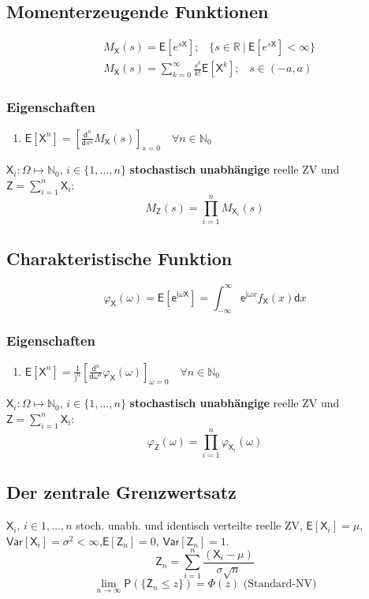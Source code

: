 \documentclass[a4paper,twocolumn,10pt]{article}
\newenvironment{iii}{\begin{enumerate}[label={\roman{*})}]}{\end{enumerate}}
\newcommand{\var}{\mathsf{Var}}
\newcommand{\erw}{\mathsf{E}}
\newcommand{\e}{\mathsf{e}}
\newcommand{\X}{\mathsf{X}}
\newcommand{\im}{\mathrm{j}}
\begin{document}
\subsection{Momenterzeugende Funktionen}
\[\begin{split}&M_{\mathsf{X}}(s)= \erw[e^{s\mathsf{X}}];\;\;\;\{ s \in \mathbb{R} \ | \ \erw[e^{s \mathsf{X}}] < \infty \}\\ &M_{\mathsf{X}}(s)= \sum \limits_{k=0}^{\infty} \frac{s^{k}}{k!} \erw[\mathsf{X}^{k}];\;\;\; s \in (-a,a)\end{split}\]

\subsubsection{Eigenschaften}
\begin{iii}
\item $\erw [\mathsf{X}^{n}] = \left[ \frac{\mathsf{d}^{n}}{\mathsf{d}s^{n}}  M_{\mathsf{X}}(s) \right]_{s=0} \quad \forall n \in \mathbb{N}_{0}$
\end{iii}
$\mathsf{X}_{i}: \Omega \mapsto \mathbb{N}_{0}, \, i \in \{1, \dots, n\}$ \textbf{stochastisch unabhängige} reelle ZV und $\mathsf{Z} = \sum_{i=1}^{n} \mathsf{X}_{i}$:
\[ M_{\mathsf{Z}}(s) = \prod_{i=1}^{n} M_{\mathsf{X}_{i}}(s) \]

\subsection{Charakteristische Funktion}
\[ \varphi_{\mathsf{X}}(\omega) = \erw[\e^{\im\omega \mathsf{X}}] = \int_{-\infty}^{\infty}\e^{\im\omega x}f_\X(x) \mathsf dx\]

\subsubsection{Eigenschaften}
\begin{iii}
 \item $\erw [\mathsf{X}^{n}] = \frac{1}{\im^{n}} \left[ \frac{\mathsf{d}^{n}}{\mathsf{d}\omega^{n}}  \varphi_{\mathsf{X}}(\omega)\right]_{\omega=0}  \quad \forall n \in \mathbb{N}_{0}$
\end{iii}
$\mathsf{X}_{i}: \Omega \mapsto \mathbb{N}_{0}, \, i \in \{1, \dots, n\}$ \textbf{stochastisch unabhängige} reelle ZV und $\mathsf{Z} = \sum_{i=1}^{n} \mathsf{X}_{i}$:
\[ \varphi_{\mathsf{Z}}(\omega) = \prod_{i=1}^{n} \varphi_{\mathsf{X}_{i}}(\omega) \]

\subsection{Der zentrale Grenzwertsatz}
$\mathsf{X}_{i}, \, i \in {1, \dots, n}$ stoch. unabh. und identisch verteilte reelle ZV, $\erw[\mathsf{X}_{i}] = \mu$, $\var[\mathsf{X}_{i}] = \sigma^{2} < \infty$,$\erw[\mathsf{Z}_{n}] = 0$, $\var[\mathsf{Z}_{n}] = 1$.
\[ \mathsf{Z}_{n} = \sum \limits_{i=1}^{n} \frac{(\mathsf{X}_{i}- \mu)}{\sigma \sqrt{n}} \]
\[ \lim_{n \to \infty} \mathsf{P}(\{\mathsf{Z}_{n} \leq z\}) = \Phi(z)\text{  (Standard-NV)} \]
\end{document}

